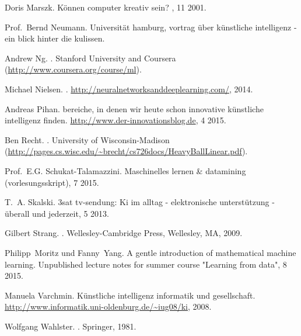 \begin{thebibliography}{99}
Doris Marszk.
\newblock Können computer kreativ sein?
, 11 2001.

Prof.~Bernd Neumann.
\newblock Universit\"at hamburg, vortrag \"uber künstliche intelligenz - ein
  blick hinter die kulissen.

Andrew Ng.
.
\newblock Stanford University and Coursera
  (\url{http://www.coursera.org/course/ml}).

Michael Nielsen.
.
\newblock \url{http://neuralnetworksanddeeplearning.com/}, 2014.

Andreas Pihan.
 bereiche, in denen wir heute schon innovative künstliche
  intelligenz finden.
\newblock \url{http://www.der-innovationsblog.de}, 4 2015.

Ben Recht.
.
\newblock University of Wisconsin-Madison
  (\url{http://pages.cs.wisc.edu/~brecht/cs726docs/HeavyBallLinear.pdf}).

Prof.~E.G. Schukat-Talamazzini.
\newblock Maschinelles lernen \& datamining (vorlesungsskript), 7 2015.

T.~A. Skalski.
\newblock 3sat tv-sendung: Ki im alltag - elektronische unterstützung -
  überall und jederzeit, 5 2013.

Gilbert Strang.
.
\newblock Wellesley-Cambridge Press, Wellesley, MA, 2009.

Philipp~Moritz und Fanny~Yang.
\newblock A gentle introduction of mathematical machine learning.
\newblock Unpublished lecture notes for summer course "Learning from data", 8
  2015.

Manuela Varchmin.
\newblock Künstliche intelligenz informatik und gesellschaft.
\newblock \url{http://www.informatik.uni-oldenburg.de/~iug08/ki}, 2008.

Wolfgang Wahlster.
.
\newblock Springer, 1981.



\end{thebibliography}


%
